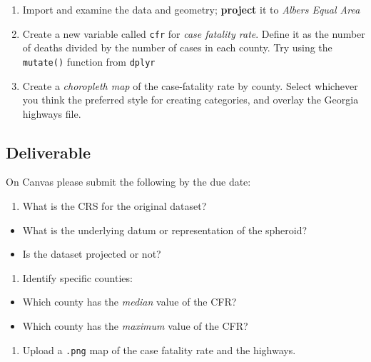 \documentclass[
]{book}
\providecommand{\tightlist}{%
  \setlength{\itemsep}{0pt}\setlength{\parskip}{0pt}}
\begin{document}
\begin{enumerate}
\def\labelenumi{\arabic{enumi}.}
\tightlist
\item
  Import and examine the data and geometry; \textbf{project} it to \emph{Albers Equal Area}
\item
  Create a new variable called \texttt{cfr} for \emph{case fatality rate}. Define it as the number of deaths divided by the number of cases in each county. Try using the \texttt{mutate()} function from \texttt{dplyr}
\item
  Create a \emph{choropleth map} of the case-fatality rate by county. Select whichever you think the preferred style for creating categories, and overlay the Georgia highways file.
\end{enumerate}

\hypertarget{deliverable}{%
\subsection{Deliverable}\label{deliverable}}

On Canvas please submit the following by the due date:

\begin{enumerate}
\def\labelenumi{\arabic{enumi}.}
\tightlist
\item
  What is the CRS for the original dataset?
\end{enumerate}

\begin{itemize}
\tightlist
\item
  What is the underlying datum or representation of the spheroid?
\item
  Is the dataset projected or not?
\end{itemize}

\begin{enumerate}
\def\labelenumi{\arabic{enumi}.}
\setcounter{enumi}{1}
\tightlist
\item
  Identify specific counties:
\end{enumerate}

\begin{itemize}
\tightlist
\item
  Which county has the \emph{median} value of the CFR?
\item
  Which county has the \emph{maximum} value of the CFR?
\end{itemize}

\begin{enumerate}
\def\labelenumi{\arabic{enumi}.}
\setcounter{enumi}{2}
\tightlist
\item
  Upload a \texttt{.png} map of the case fatality rate and the highways.
\end{enumerate}

  
\end{document}
